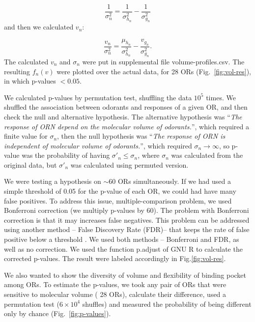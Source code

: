 \documentclass[11pt]{paper} %
\newcommand{\numberofreceptors}{ 28 }
\begin{document}
\begin{equation}
	\frac{1}{\sigma_n^2} = \frac{1}{\sigma^2_{h_n}}  - \frac{1}{\sigma^2_{g_n}}
\end{equation}
and then we calculated $v_n$: 

\begin{equation}
	\frac{v_n}{\sigma_n^2}  =    \frac{\mu_{h_n}}{\sigma^2_{h_n}} - \frac{v_{g_n}}{\sigma^2_{g_n}}.
\end{equation}
The calculated $v_n$ and $\sigma_n$ were put in supplemental file volume-profiles.csv. 
The resulting $f_n(v)$ were plotted over the actual data, for \numberofreceptors ORs (Fig.~\ref{fig:vol-res}),
in which p-values $<0.05$. 

We calculated p-values by permutation test, shuffling the data $10^5$ times. 
We shuffled the association between odorants and responses of a given OR,  
and then check the null and alternative hypothesis. 
The alternative hypothesis was
``{\it The response of ORN depend on the molecular volume of odorants.}'', 
which required  a finite value for $\sigma_n$, 
then the null hypothesis was 
``{\it The response of ORN is independent of molecular volume of odorants.}'',
which required $\sigma_n \rightarrow \infty$, 
so p-value was the probability of having $\sigma'_n\leq\sigma_n$, 
where $\sigma_n$ was calculated from the original data, but $\sigma'_n$ was calculated using permuted version. 

We were testing a hypothesis on $\sim$60 ORs simultaneously. 
If we had used a simple threshold of 0.05 for the p-value of each OR, we could had have many false positives. 
To address this issue, multiple-comparison problem, 
we used Bonferroni correction (we multiply p-values by 60). 
The problem with Bonferroni correction is that it may increases false negatives.
This problem can be addressed using another method -- False Discovery Rate (FDR)--  that keeps the rate of false positive below a threshold \cite{benjamini1995controlling,shaffer1995multiple}.
We used both methods -- Bonferroni and FDR, as well as no correction. We used the function p.adjust of GNU R to calculate the corrected p-values. 
The result were labeled accordingly in Fig.\ref{fig:vol-res}.

We also wanted to show the diversity of volume and flexibility of binding pocket among ORs.
To estimate the p-values, 
we took any pair of ORs that were sensitive to molecular volume (\numberofreceptors ORs),
calculate their difference, 
used a permutation test ($6\times10^4$ shuffles) and measured the probability of being different only by chance (Fig.~\ref{fig:p-values}).
\end{document}
